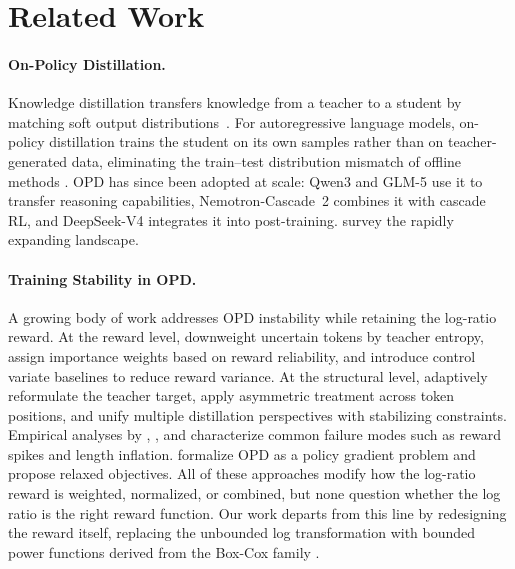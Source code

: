 \newpage
\appendix

\section{Related Work}

\paragraph{On-Policy Distillation.}
Knowledge distillation  transfers knowledge from a teacher to a student by matching soft output distributions~\cite{hinton2015distilling,hsieh2023distilling,chen2025unveiling}.
For autoregressive language models, on-policy distillation trains the student on its own samples rather than on teacher-generated data, eliminating the train--test distribution mismatch of offline methods \citep{gu2024minillm, agarwal2024gkd}.
OPD has since been adopted at scale: Qwen3 \citep{qwen3} and GLM-5 \citep{glm5} use it to transfer reasoning capabilities, Nemotron-Cascade~2 \citep{nemotron2} combines it with cascade RL, and DeepSeek-V4 \citep{deepseekv4} integrates it into post-training.
\citet{song2026survey} survey the rapidly expanding landscape.

\paragraph{Training Stability in OPD.}
A growing body of work addresses OPD instability while retaining the log-ratio reward.
At the reward level, \citet{jin2026entropy} downweight uncertain tokens by teacher entropy, \citet{xu2026tip} assign importance weights based on reward reliability, and \citet{oh2026kl} introduce control variate baselines to reduce reward variance.
At the structural level, \citet{jang2026stable} adaptively reformulate the teacher target, \citet{jia2026asymmetric} apply asymmetric treatment across token positions, and \citet{hou2026uniopd} unify multiple distillation perspectives with stabilizing constraints.
Empirical analyses by \citet{fu2026revisiting}, \citet{luo2026demystifying}, and \citet{li2026rethinking} characterize common failure modes such as reward spikes and length inflation.
\citet{ko2026reopold} formalize OPD as a policy gradient problem and propose relaxed objectives.
All of these approaches modify how the log-ratio reward is weighted, normalized, or combined, but none question whether the log ratio is the right reward function.
Our work departs from this line by redesigning the reward itself, replacing the unbounded log transformation with bounded power functions derived from the Box-Cox family \citep{boxcox1964}.

